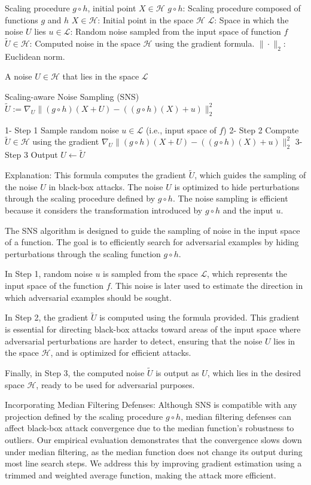 Scaling procedure $g \circ h$, initial point $X \in \mathcal{H}$
$g \circ h$: Scaling procedure composed of functions $g$ and $h$
$X \in \mathcal{H}$: Initial point in the space $\mathcal{H}$
$\mathcal{L}$: Space in which the noise $U$ lies
$u \in \mathcal{L}$: Random noise sampled from the input space of function $f$
$\tilde{U} \in \mathcal{H}$: Computed noise in the space $\mathcal{H}$ using the gradient formula.
$\| \cdot \|_2$: Euclidean norm.

A noise $U \in \mathcal{H}$ that lies in the space $\mathcal{L}$

Scaling-aware Noise Sampling (SNS)
$\tilde{U} := \nabla_U \| (g \circ h)(X + U) - ((g \circ h)(X) + u) \|_2^2$

1- Step 1
    \STATE Sample random noise $u \in \mathcal{L}$ (i.e., input space of $f$)
2- Step 2
    \STATE Compute $\tilde{U} \in \mathcal{H}$ using the gradient $\nabla_U \| (g \circ h)(X + U) - ((g \circ h)(X) + u) \|_2^2$
3- Step 3
    \STATE Output $U \leftarrow \tilde{U}$

Explanation: This formula computes the gradient $\tilde{U}$, which guides the sampling of the noise $U$ in black-box attacks. The noise $U$ is optimized to hide perturbations through the scaling procedure defined by $g \circ h$. The noise sampling is efficient because it considers the transformation introduced by $g \circ h$ and the input $u$.

The SNS algorithm is designed to guide the sampling of noise in the input space of a function. The goal is to efficiently search for adversarial examples by hiding perturbations through the scaling function $g \circ h$.

In Step 1, random noise $u$ is sampled from the space $\mathcal{L}$, which represents the input space of the function $f$. This noise is later used to estimate the direction in which adversarial examples should be sought.

In Step 2, the gradient $\tilde{U}$ is computed using the formula provided. This gradient is essential for directing black-box attacks toward areas of the input space where adversarial perturbations are harder to detect, ensuring that the noise $U$ lies in the space $\mathcal{H}$, and is optimized for efficient attacks.

Finally, in Step 3, the computed noise $\tilde{U}$ is output as $U$, which lies in the desired space $\mathcal{H}$, ready to be used for adversarial purposes.

Incorporating Median Filtering Defenses:
Although SNS is compatible with any projection defined by the scaling procedure $g \circ h$, median filtering defenses can affect black-box attack convergence due to the median function's robustness to outliers. Our empirical evaluation demonstrates that the convergence slows down under median filtering, as the median function does not change its output during most line search steps. We address this by improving gradient estimation using a trimmed and weighted average function, making the attack more efficient.

